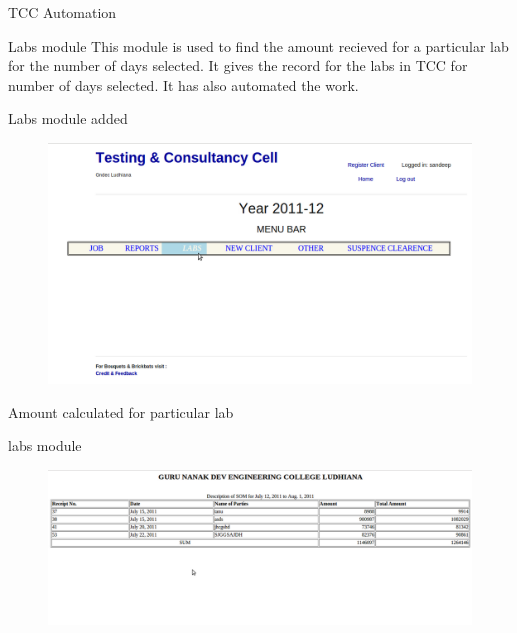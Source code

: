 \newpage
\begin{frame}{TCC Automation}
\begin{block}{Labs module}
This module is used to find the amount recieved for a particular lab for the number of days selected. It gives the record for the labs in TCC for number of days selected. It has also automated the work.
\end{block}
\end{frame}
\newpage
\begin{frame}{Labs module added}
\begin{figure}
\label{imag}
\centering
\includegraphics[scale=0.2]{s4.png}
\end{figure}
\end{frame}
\newpage
\begin{frame}{Amount calculated for particular lab}
\begin{block}{labs module}
\begin{figure}
\label{imag}
\centering
\includegraphics[scale=0.2]{lb.png}
\end{figure}
\end{block}
\end{frame}

